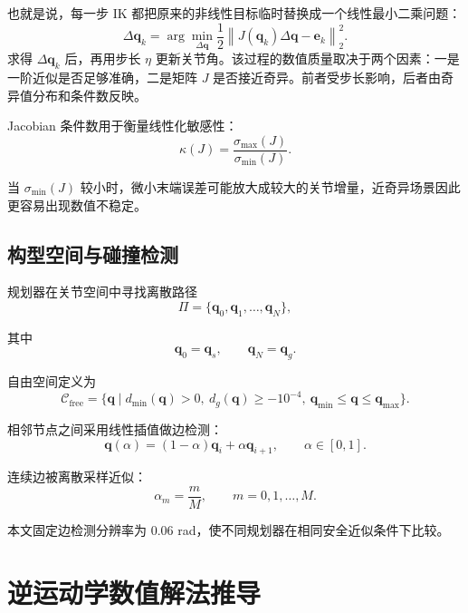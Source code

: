\documentclass[UTF8,zihao=-4]{ctexart}
\newcommand{\norm}[1]{\left\lVert #1 \right\rVert}
\begin{document}
也就是说，每一步 IK 都把原来的非线性目标临时替换成一个线性最小二乘问题：
\begin{equation}
  \Delta\bm q_k
  =
  \arg\min_{\Delta\bm q}
  \frac{1}{2}\norm{J(\bm q_k)\Delta\bm q-\bm e_k}_2^2 .
  \label{eq:ik-local-ls}
\end{equation}
求得 $\Delta\bm q_k$ 后，再用步长 $\eta$ 更新关节角。该过程的数值质量取决于两个因素：一是一阶近似是否足够准确，二是矩阵 $J$ 是否接近奇异。前者受步长影响，后者由奇异值分布和条件数反映。

Jacobian 条件数用于衡量线性化敏感性：
\begin{equation}
  \kappa(J)=\frac{\sigma_{\max}(J)}{\sigma_{\min}(J)} .
  \label{eq:condition}
\end{equation}

当 $\sigma_{\min}(J)$ 较小时，微小末端误差可能放大成较大的关节增量，近奇异场景因此更容易出现数值不稳定。

\subsection{构型空间与碰撞检测}
规划器在关节空间中寻找离散路径
\begin{equation}
  \Pi=\{\bm q_0,\bm q_1,\ldots,\bm q_N\},
  \label{eq:path}
\end{equation}

其中
\begin{equation}
  \bm q_0=\bm q_s,\qquad \bm q_N=\bm q_g .
  \label{eq:path-boundary}
\end{equation}

自由空间定义为
\begin{equation}
  \mathcal C_{\mathrm{free}}
  =
  \{\bm q\mid d_{\min}(\bm q)>0,\ d_g(\bm q)\geq -10^{-4},\ \bm q_{\min}\leq \bm q\leq \bm q_{\max}\}.
  \label{eq:c-free}
\end{equation}

相邻节点之间采用线性插值做边检测：
\begin{equation}
  \bm q(\alpha)=(1-\alpha)\bm q_i+\alpha\bm q_{i+1},
  \qquad
  \alpha\in[0,1].
  \label{eq:edge-interp}
\end{equation}

连续边被离散采样近似：
\begin{equation}
  \alpha_m=\frac{m}{M},\qquad m=0,1,\ldots,M .
  \label{eq:edge-sample}
\end{equation}

本文固定边检测分辨率为 $0.06$ rad，使不同规划器在相同安全近似条件下比较。

\section{逆运动学数值解法推导}
\end{document}
